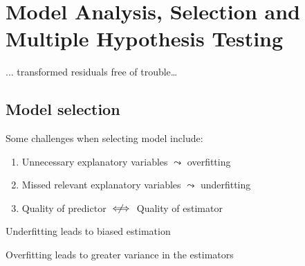 \section{Model Analysis, Selection and Multiple Hypothesis Testing}


... transformed residuals free of trouble\dots
{}

\subsection{Model selection}
Some challenges when selecting model include:
\begin{enumerate}
    \item Unnecessary explanatory variables $\leadsto$ overfitting
    \item Missed relevant explanatory variables $\leadsto$ underfitting
    \item Quality of predictor $\centernot\iff$ Quality of estimator
\end{enumerate}


Underfitting leads to biased estimation

Overfitting leads to greater variance in the estimators

